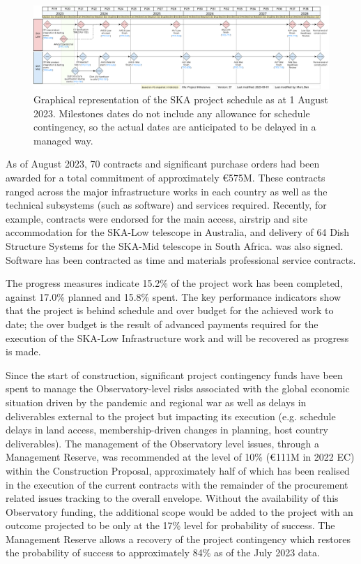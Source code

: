 \documentclass[a4paper,
               biblatex,     %
               keeplastbox,   %
               ]{jacow}
\begin{document}
 \begin{figure}[tb]
	\centering
	  \includegraphics[width=\textwidth]{FR1BCO03f2.png}
	\caption{
		Graphical representation of the SKA project schedule as at 1 August 2023. Milestones dates do not include any allowance for schedule contingency, so the actual dates are anticipated to be delayed in a managed way.
	}
	\label{fig:ska-timeline}
  \end{figure}


As of August 2023, 70 contracts and significant purchase orders had been awarded for a total commitment of approximately €575M. These contracts ranged across the major infrastructure works in each country as well as the technical subsystems (such as software) and services required. Recently, for example, contracts were endorsed for the main access, airstrip and site accommodation for the SKA-Low telescope in Australia, and delivery of 64 Dish Structure Systems for the SKA-Mid telescope in South Africa. was also signed. Software has been contracted as time and materials professional service contracts.

The progress measures indicate 15.2\% of the project work has been completed, against 17.0\% planned and 15.8\% spent.  The key performance indicators show that the project is behind schedule and over budget for the achieved work to date; the over budget is the result of advanced payments required for the execution of the SKA-Low Infrastructure work and will be recovered as progress is made.

Since the start of construction, significant project contingency funds have been spent to manage the Observatory-level risks associated with the global economic situation driven by the pandemic and regional war as well as delays in deliverables external to the project but impacting its execution (e.g. schedule delays in land access, membership-driven changes in planning, host country deliverables). The management of the Observatory level issues, through a Management Reserve, was recommended at the level of 10\% (€111M in 2022 EC) within the Construction Proposal, approximately half of which has been realised in the execution of the current contracts with the remainder of the procurement related issues tracking to the overall envelope. Without the availability of this Observatory funding, the additional scope would be added to the project with an outcome projected to be only at the 17\% level for probability of success. The Management Reserve allows a recovery of the project contingency which restores the probability of success to approximately 84\% as of the July 2023 data.
\end{document}

